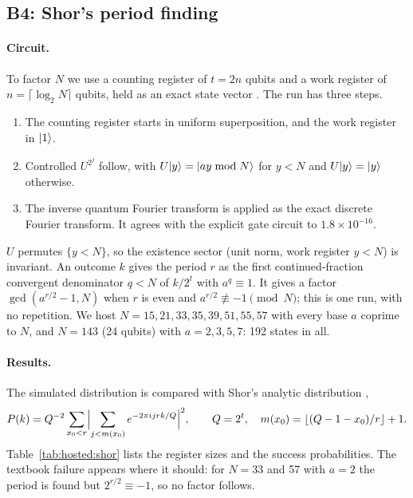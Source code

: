 \subsection{B4: Shor's period finding}\label{app:hosted:b4}

\paragraph{Circuit.} To factor $N$ we use a counting register of $t=2n$ qubits and a work register of $n=\lceil\log_2N\rceil$ qubits,
held as an exact state vector \cite{shor1997}. The run has three steps.
\begin{enumerate}[nosep]
\item The counting register starts in uniform superposition, and the work register in $\lvert 1\rangle$.
\item Controlled $U^{2^j}$ follow, with $U\lvert y\rangle=\lvert ay\bmod N\rangle$ for $y<N$ and $U\lvert y\rangle=\lvert y\rangle$ otherwise.
\item The inverse quantum Fourier transform is applied as the exact discrete Fourier transform. It agrees with the explicit gate circuit
to $1.8\times10^{-16}$.
\end{enumerate}
$U$ permutes $\{y<N\}$, so the existence sector (unit norm, work register $y<N$) is invariant. An outcome $k$ gives the period $r$ as
the first continued-fraction convergent denominator $q<N$ of $k/2^t$ with $a^q\equiv1$. It gives a factor $\gcd(a^{r/2}-1,N)$ when $r$
is even and $a^{r/2}\not\equiv-1\pmod N$; this is one run, with no repetition. We host $N=15,21,33,35,39,51,55,57$ with every base $a$
coprime to $N$, and $N=143$ (24 qubits) with $a=2,3,5,7$: 192 states in all.

\paragraph{Results.} The simulated distribution is compared with Shor's analytic distribution \cite{shor1997},
\[
P(k)=Q^{-2}\sum_{x_0<r}\Bigl\vert\sum_{j<m(x_0)}e^{-2\pi ijrk/Q}\Bigr\vert^2,\qquad Q=2^t,\quad m(x_0)=\lfloor(Q-1-x_0)/r\rfloor+1.
\]
Table~\ref{tab:hosted:shor} lists the register sizes and the success probabilities. The textbook failure appears where it should: for
$N=33$ and 57 with $a=2$ the period is found but $2^{r/2}\equiv-1$, so no factor follows.

